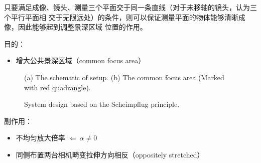 \documentclass{article}
\begin{document}
只要满足成像、镜头、测量三个平面交于同一条直线（对于未移轴的镜头，认为三个平行平面相 交于无限远处）的条件，则可以保证测量平面的物体能够清晰成像，因此能够起到调整景深区域 位置的作用。

目的：
\begin{itemize}
  \item 增大公共景深区域（common focus area）
\end{itemize}

\begin{figure}[htbp]
  \centering
  \caption{(a) The schematic of setup. (b) The common focus area (Marked with
  red quadrangle).}
\end{figure}

\begin{figure}[htbp]
  \centering
  \caption{System design based on the Scheimpflug principle.}
\end{figure}

副作用：
\begin{itemize}
  \item 不均匀放大倍率 $\Longleftarrow \, \alpha \neq 0$
  
  \item 同侧布置两台相机畸变拉伸方向相反（oppositely
  stretched）
\end{itemize}
\end{document}
